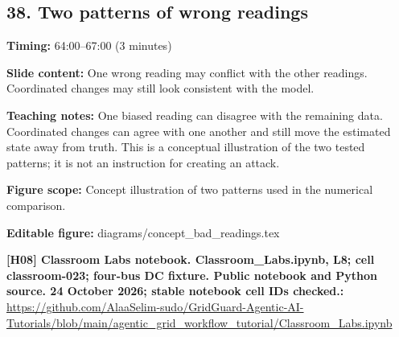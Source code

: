 \documentclass[10pt,letterpaper]{article}
\begin{document}
\subsection*{38. Two patterns of wrong readings}
\textbf{Timing:} 64:00--67:00 (3 minutes)\par
\textbf{Slide content:} One wrong reading may conflict with the other readings.
Coordinated changes may still look consistent with the model.\par
\textbf{Teaching notes:} One biased reading can disagree with the remaining data. Coordinated changes can agree with one another and still move the estimated state away from truth. This is a conceptual illustration of the two tested patterns; it is not an instruction for creating an attack.\par
\textbf{Figure scope:} Concept illustration of two patterns used in the numerical comparison.\par
\textbf{Editable figure:} diagrams/concept\_bad\_readings.tex\par
\textbf{[H08] Classroom Labs notebook. Classroom\_Labs.ipynb, L8; cell classroom-023; four-bus DC fixture. Public notebook and Python source. 24 October 2026; stable notebook cell IDs checked.:} \href{https://github.com/AlaaSelim-sudo/GridGuard-Agentic-AI-Tutorials/blob/main/agentic_grid_workflow_tutorial/Classroom_Labs.ipynb}{\small\ttfamily https:/\allowbreak{}/\allowbreak{}github.\allowbreak{}com/\allowbreak{}AlaaSelim-\allowbreak{}sudo/\allowbreak{}GridGuard-\allowbreak{}Agentic-\allowbreak{}AI-\allowbreak{}Tutorials/\allowbreak{}blob/\allowbreak{}main/\allowbreak{}agentic\_\allowbreak{}grid\_\allowbreak{}workflow\_\allowbreak{}tutorial/\allowbreak{}Classroom\_\allowbreak{}Labs.\allowbreak{}ipynb}\par
\par\medskip
\end{document}
